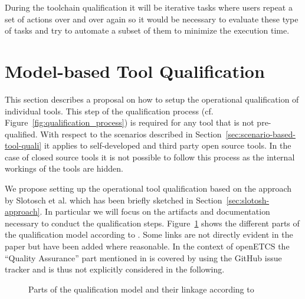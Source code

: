 During the toolchain qualification it will be iterative tasks where users repeat a set of actions over and over again so it would be necessary to evaluate these type of tasks and try to automate a subset of them to minimize the execution time.


\section{Model-based Tool Qualification}
\label{sec:model-based-tool-quali}

This section describes a proposal on how to setup the operational qualification of individual tools. This step of the qualification process (cf. Figure~\ref{fig:qualification_process}) is required for any tool that is not pre-qualified. With respect to the scenarios described in Section~\ref{sec:scenario-based-tool-quali} it applies to self-developed and third party open source tools. In the case of closed source tools it is not possible to follow this process as the internal workings of the tools are hidden.

We propose setting up the operational tool qualification based on the approach by Slotosch et al. which has been briefly sketched in Section~\ref{sec:slotosh-approach}. In particular we will focus on the artifacts and documentation necessary to conduct the qualification steps. Figure~\ref{fig:qualification-models-linkage} shows the different parts of the qualification model according to \cite{slotosch_model-based_2012}. Some links are not directly evident in the paper but have been added where reasonable. In the context of openETCS the ``Quality Assurance'' part mentioned in \cite{slotosch_model-based_2012} is covered by using the GitHub issue tracker and is thus not explicitly considered in the following.

\begin{figure}
\begin{center}
\end{center}
\caption{Parts of the qualification model and their linkage according to \cite{slotosch_model-based_2012}}
\label{fig:qualification-models-linkage}
\end{figure}

